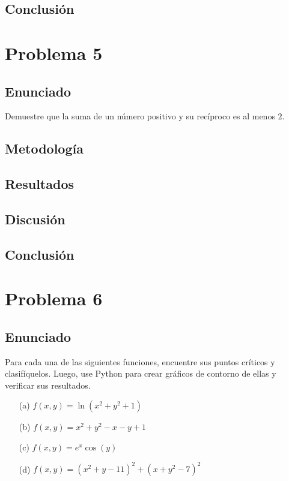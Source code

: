 \documentclass{article}
\begin{document}
\subsection{Conclusión}

\section{Problema 5}

\subsection{Enunciado}
Demuestre que la suma de un número positivo y su recíproco es al menos $2$.

\subsection{Metodología}

\subsection{Resultados}
\setcounter{equation}{0}

\subsection{Discusión}

\subsection{Conclusión}

\section{Problema 6}

\subsection{Enunciado}
Para cada una de las siguientes funciones, encuentre sus puntos críticos y clasifíquelos. Luego, use Python para crear gráficos de contorno de ellas y verificar sus resultados.

\begin{enumerate}
  \item[(a)] $f(x,y) = \ln(x^{2} + y^{2} + 1)$
  \item[(b)] $f(x,y) = x^{2} + y^{2} - x - y + 1$
  \item[(c)] $f(x,y) = e^{x}\cos(y)$
  \item[(d)] $f(x,y) = (x^{2} + y - 11)^{2} + (x + y^{2} - 7)^{2}$
\end{enumerate}
\end{document}
